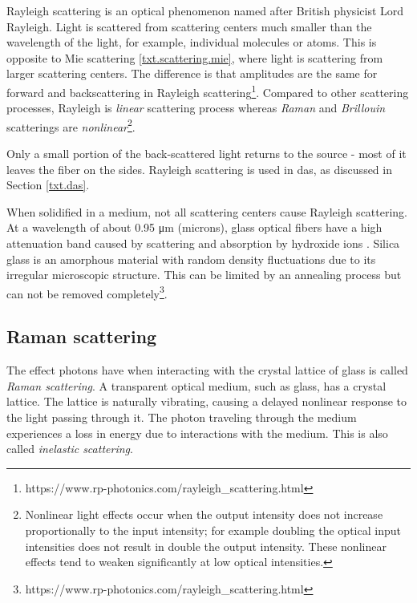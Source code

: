 Rayleigh scattering is an optical phenomenon named after British physicist Lord Rayleigh. Light is scattered from scattering centers much smaller than the wavelength of the light, for example, individual molecules or atoms. This is opposite to Mie scattering \ref{txt.scattering.mie}, where light is scattering from larger scattering centers. The difference is that amplitudes are the same for forward and backscattering in Rayleigh scattering\footnote{https://www.rp-photonics.com/rayleigh\_scattering.html}. Compared to other scattering processes, Rayleigh is \textit{linear} scattering process whereas \textit{Raman} and \textit{Brillouin} scatterings are \textit{nonlinear}\footnote{Nonlinear light effects occur when the output intensity does not increase proportionally to the input intensity; for example doubling the optical input intensities does not result in double the output intensity. These nonlinear effects tend to weaken significantly at low optical intensities.}.

Only a small portion of the back-scattered light returns to the source - most of it leaves the fiber on the sides. Rayleigh scattering is used in \ac{das}, as discussed in Section \ref{txt.das}.

When solidified in a medium, not all scattering centers cause Rayleigh scattering. At a wavelength of about 0.95 μm (microns), glass optical fibers have a high attenuation band caused by scattering and absorption by hydroxide ions \cite{scatteringcenterbook}. Silica glass is an amorphous material with random density fluctuations due to its irregular microscopic structure. This can be limited by an annealing process but can not be removed completely\footnote{https://www.rp-photonics.com/rayleigh\_scattering.html}.




\subsection{Raman scattering}\label{txt.scattering.ram}

The effect photons have when interacting with the crystal lattice of glass is called \textit{Raman scattering}. A transparent optical medium, such as glass, has a crystal lattice. The lattice is naturally vibrating, causing a delayed nonlinear response to the light passing through it. The photon traveling through the medium experiences a loss in energy due to interactions with the medium. This is also called \textit{inelastic scattering}. 

